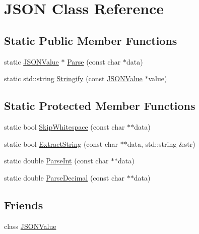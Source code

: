 \hypertarget{classJSON}{
\section{JSON Class Reference}
\label{classJSON}
}
\subsection*{Static Public Member Functions}
\begin{DoxyCompactItemize}
\item 
static \hyperlink{classJSONValue}{JSONValue} $\ast$ \hyperlink{classJSON_a7f3d733e38c15aaeee7223831f9739a3}{Parse} (const char $\ast$data)
\item 
static std::string \hyperlink{classJSON_a599f5c5792e9995314da85d8ab8a83b9}{Stringify} (const \hyperlink{classJSONValue}{JSONValue} $\ast$value)
\end{DoxyCompactItemize}
\subsection*{Static Protected Member Functions}
\begin{DoxyCompactItemize}
\item 
static bool \hyperlink{classJSON_a6101b573a904af0ea2fee028071814e9}{SkipWhitespace} (const char $\ast$$\ast$data)
\item 
static bool \hyperlink{classJSON_ac8f6350078266a15d18b685e06f58caa}{ExtractString} (const char $\ast$$\ast$data, std::string \&str)
\item 
static double \hyperlink{classJSON_a470e922f11065159826bbd59d8b73889}{ParseInt} (const char $\ast$$\ast$data)
\item 
static double \hyperlink{classJSON_a6d4eb6810c7b29a21a6346dbb8edfd2e}{ParseDecimal} (const char $\ast$$\ast$data)
\end{DoxyCompactItemize}
\subsection*{Friends}
\begin{DoxyCompactItemize}
\item 
\hypertarget{classJSON_ad2efeda1c797ac7a1371213b1b6ffdcf}{
class \hyperlink{classJSON_ad2efeda1c797ac7a1371213b1b6ffdcf}{JSONValue}}
\label{classJSON_ad2efeda1c797ac7a1371213b1b6ffdcf}

\end{DoxyCompactItemize}



